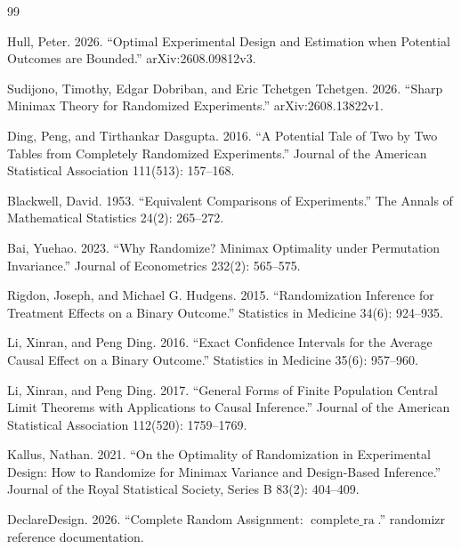 \documentclass{article}
\begin{document}
\begin{thebibliography}{99}

   Hull, Peter. 2026. ``Optimal Experimental Design and Estimation when Potential Outcomes are Bounded.'' arXiv:2608.09812v3.

   Sudijono, Timothy, Edgar Dobriban, and Eric Tchetgen Tchetgen. 2026. ``Sharp Minimax Theory for Randomized Experiments.'' arXiv:2608.13822v1.

   Ding, Peng, and Tirthankar Dasgupta. 2016. ``A Potential Tale of Two by Two Tables from Completely Randomized Experiments.'' Journal of the American Statistical Association 111(513): 157--168.

   Blackwell, David. 1953. ``Equivalent Comparisons of Experiments.'' The Annals of Mathematical Statistics 24(2): 265--272.

   Bai, Yuehao. 2023. ``Why Randomize? Minimax Optimality under Permutation Invariance.'' Journal of Econometrics 232(2): 565--575.

   Rigdon, Joseph, and Michael G. Hudgens. 2015. ``Randomization Inference for Treatment Effects on a Binary Outcome.'' Statistics in Medicine 34(6): 924--935.

   Li, Xinran, and Peng Ding. 2016. ``Exact Confidence Intervals for the Average Causal Effect on a Binary Outcome.'' Statistics in Medicine 35(6): 957--960.

   Li, Xinran, and Peng Ding. 2017. ``General Forms of Finite Population Central Limit Theorems with Applications to Causal Inference.'' Journal of the American Statistical Association 112(520): 1759--1769.

   Kallus, Nathan. 2021. ``On the Optimality of Randomization in Experimental Design: How to Randomize for Minimax Variance and Design-Based Inference.'' Journal of the Royal Statistical Society, Series B 83(2): 404--409.

   DeclareDesign. 2026. ``Complete Random Assignment: \(\operatorname{complete\_ra}\).'' randomizr reference documentation.

\end{thebibliography}
\end{document}
